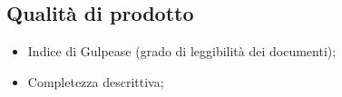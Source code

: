 \subsection{Qualità di prodotto}

\begin{itemize}
  \item Indice di Gulpease (grado di leggibilità dei documenti);
  \item Completezza descrittiva;
\end{itemize}